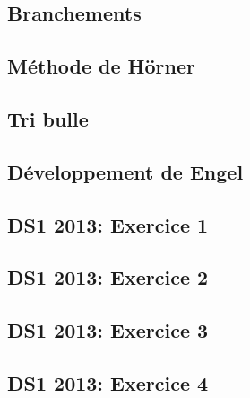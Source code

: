 

\subsection{Branchements}

\subsection{Méthode de Hörner}

\subsection{Tri bulle}

\subsection{Développement de Engel}

\subsection*{DS1 2013: Exercice 1}

\subsection*{DS1 2013: Exercice 2}

\subsection*{DS1 2013: Exercice 3}

\subsection*{DS1 2013: Exercice 4}

